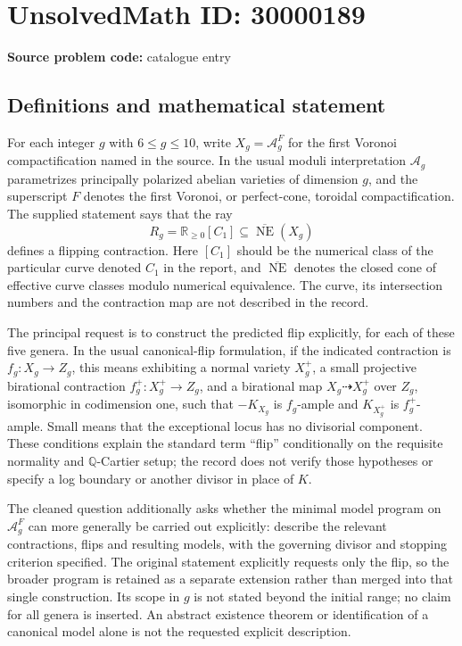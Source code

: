 \documentclass[11pt]{article}
\newcommand{\Q}{\mathbb{Q}}
\newcommand{\R}{\mathbb{R}}
\begin{document}
\section*{UnsolvedMath ID: 30000189}
\textbf{Source problem code:} catalogue entry
\subsection{Definitions and mathematical statement}
For each integer \(g\) with \(6\leq g\leq10\), write \(X_g=\mathcal A_g^F\) for the first Voronoi compactification named in the source. In the usual moduli interpretation \(\mathcal A_g\) parametrizes principally polarized abelian varieties of dimension \(g\), and the superscript \(F\) denotes the first Voronoi, or perfect-cone, toroidal compactification. The supplied statement says that the ray
\[
 R_g=\R_{\geq0}[C_1]\subseteq\overline{\operatorname{NE}}(X_g)
\]
defines a flipping contraction. Here \([C_1]\) should be the numerical class of the particular curve denoted \(C_1\) in the report, and \(\overline{\operatorname{NE}}\) denotes the closed cone of effective curve classes modulo numerical equivalence. The curve, its intersection numbers and the contraction map are not described in the record.

The principal request is to construct the predicted flip explicitly, for each of these five genera. In the usual canonical-flip formulation, if the indicated contraction is \(f_g:X_g\to Z_g\), this means exhibiting a normal variety \(X_g^+\), a small projective birational contraction \(f_g^+:X_g^+\to Z_g\), and a birational map \(X_g\dashrightarrow X_g^+\) over \(Z_g\), isomorphic in codimension one, such that \(-K_{X_g}\) is \(f_g\)-ample and \(K_{X_g^+}\) is \(f_g^+\)-ample. Small means that the exceptional locus has no divisorial component. These conditions explain the standard term ``flip'' conditionally on the requisite normality and \(\Q\)-Cartier setup; the record does not verify those hypotheses or specify a log boundary or another divisor in place of \(K\).

The cleaned question additionally asks whether the minimal model program on \(\mathcal A_g^F\) can more generally be carried out explicitly: describe the relevant contractions, flips and resulting models, with the governing divisor and stopping criterion specified. The original statement explicitly requests only the flip, so the broader program is retained as a separate extension rather than merged into that single construction. Its scope in \(g\) is not stated beyond the initial range; no claim for all genera is inserted. An abstract existence theorem or identification of a canonical model alone is not the requested explicit description.
\end{document}
